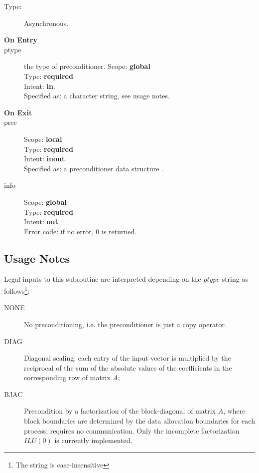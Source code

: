 \begin{description}
\item[Type:] Asynchronous.
\item[\bf On Entry]
\item[ptype] the type of preconditioner. 
Scope: {\bf global} \\
Type: {\bf required}\\
Intent: {\bf in}.\\
Specified as: a character string, see usage notes.
\item[\bf On Exit]

\item[prec] 
Scope: {\bf local} \\
Type: {\bf required}\\
Intent: {\bf inout}.\\
Specified as: a preconditioner data structure \precdata.
\item[info] 
Scope: {\bf global} \\
Type: {\bf required}\\
Intent: {\bf out}.\\
Error code: if no error, 0 is returned.
\end{description}
\subsection*{Usage Notes}
Legal inputs to this subroutine are interpreted depending on the
$ptype$ string as follows\footnote{The string is case-insensitive}:
\begin{description}
\item[NONE] No preconditioning, i.e. the preconditioner is just a copy
  operator.
\item[DIAG] Diagonal scaling; each entry of the input vector is
  multiplied by the reciprocal of the sum of the absolute values of
  the coefficients in the corresponding row of matrix  $A$;
\item[BJAC] Precondition by a  factorization of the
  block-diagonal of matrix $A$, where block boundaries are determined
  by the data allocation boundaries for each process; requires no
  communication. Only the incomplete factorization $ILU(0)$ is
  currently implemented.  
\end{description}


